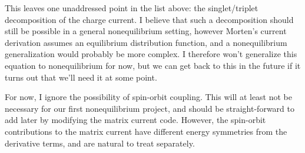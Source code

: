This leaves one unaddressed point in the list above: the singlet/triplet decomposition of the charge current.
I believe that such a decomposition should still be possible in a general nonequilibrium setting, however Morten's current derivation assumes an equilibrium distribution function, and a nonequilibrium generalization would probably be more complex.
I therefore won't generalize this equation to nonequilibrium for now, but we can get back to this in the future if it turns out that we'll need it at some point.

For now, I ignore the possibility of spin-orbit coupling.
This will at least not be necessary for our first nonequilibrium project, and should be straight-forward to add later by modifying the matrix current code.
However, the spin-orbit contributions to the matrix current have different energy symmetries from the derivative terms, and are natural to treat separately.


\clearpage
